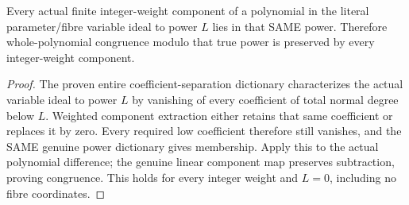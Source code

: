\begin{lemma}
\label{hir:relative-normal-graph-weight-preserves-jet-power}
\leanok
Every actual finite integer-weight component of a polynomial in the literal parameter/fibre variable ideal to power $L$ lies in that SAME power. Therefore whole-polynomial congruence modulo that true power is preserved by every integer-weight component.
\end{lemma}
\begin{proof}
The proven entire coefficient-separation dictionary characterizes the actual variable ideal to power $L$ by vanishing of every coefficient of total normal degree below $L$. Weighted component extraction either retains that same coefficient or replaces it by zero. Every required low coefficient therefore still vanishes, and the SAME genuine power dictionary gives membership. Apply this to the actual polynomial difference; the genuine linear component map preserves subtraction, proving congruence. This holds for every integer weight and $L=0$, including no fibre coordinates.
\end{proof}

